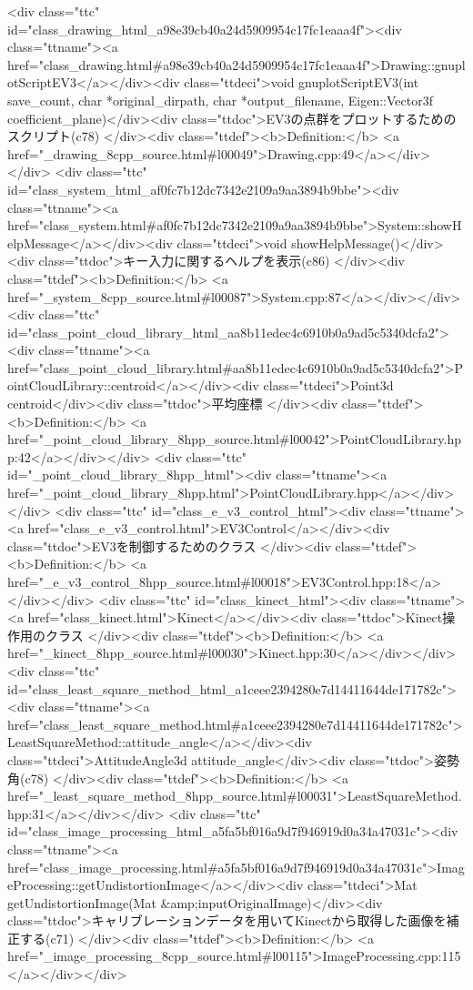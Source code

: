 <div class="ttc" id="class_drawing_html_a98e39cb40a24d5909954c17fc1eaaa4f"><div class="ttname"><a href="class_drawing.html#a98e39cb40a24d5909954c17fc1eaaa4f">Drawing::gnuplotScriptEV3</a></div><div class="ttdeci">void gnuplotScriptEV3(int save_count, char *original_dirpath, char *output_filename, Eigen::Vector3f coefficient_plane)</div><div class="ttdoc">EV3の点群をプロットするためのスクリプト(c78) </div><div class="ttdef"><b>Definition:</b> <a href="_drawing_8cpp_source.html#l00049">Drawing.cpp:49</a></div></div>
<div class="ttc" id="class_system_html_af0fc7b12dc7342e2109a9aa3894b9bbe"><div class="ttname"><a href="class_system.html#af0fc7b12dc7342e2109a9aa3894b9bbe">System::showHelpMessage</a></div><div class="ttdeci">void showHelpMessage()</div><div class="ttdoc">キー入力に関するヘルプを表示(c86) </div><div class="ttdef"><b>Definition:</b> <a href="_system_8cpp_source.html#l00087">System.cpp:87</a></div></div>
<div class="ttc" id="class_point_cloud_library_html_aa8b11edec4c6910b0a9ad5c5340dcfa2"><div class="ttname"><a href="class_point_cloud_library.html#aa8b11edec4c6910b0a9ad5c5340dcfa2">PointCloudLibrary::centroid</a></div><div class="ttdeci">Point3d centroid</div><div class="ttdoc">平均座標 </div><div class="ttdef"><b>Definition:</b> <a href="_point_cloud_library_8hpp_source.html#l00042">PointCloudLibrary.hpp:42</a></div></div>
<div class="ttc" id="_point_cloud_library_8hpp_html"><div class="ttname"><a href="_point_cloud_library_8hpp.html">PointCloudLibrary.hpp</a></div></div>
<div class="ttc" id="class_e_v3_control_html"><div class="ttname"><a href="class_e_v3_control.html">EV3Control</a></div><div class="ttdoc">EV3を制御するためのクラス </div><div class="ttdef"><b>Definition:</b> <a href="_e_v3_control_8hpp_source.html#l00018">EV3Control.hpp:18</a></div></div>
<div class="ttc" id="class_kinect_html"><div class="ttname"><a href="class_kinect.html">Kinect</a></div><div class="ttdoc">Kinect操作用のクラス </div><div class="ttdef"><b>Definition:</b> <a href="_kinect_8hpp_source.html#l00030">Kinect.hpp:30</a></div></div>
<div class="ttc" id="class_least_square_method_html_a1ceee2394280e7d14411644de171782c"><div class="ttname"><a href="class_least_square_method.html#a1ceee2394280e7d14411644de171782c">LeastSquareMethod::attitude_angle</a></div><div class="ttdeci">AttitudeAngle3d attitude_angle</div><div class="ttdoc">姿勢角(c78) </div><div class="ttdef"><b>Definition:</b> <a href="_least_square_method_8hpp_source.html#l00031">LeastSquareMethod.hpp:31</a></div></div>
<div class="ttc" id="class_image_processing_html_a5fa5bf016a9d7f946919d0a34a47031c"><div class="ttname"><a href="class_image_processing.html#a5fa5bf016a9d7f946919d0a34a47031c">ImageProcessing::getUndistortionImage</a></div><div class="ttdeci">Mat getUndistortionImage(Mat &amp;inputOriginalImage)</div><div class="ttdoc">キャリブレーションデータを用いてKinectから取得した画像を補正する(c71) </div><div class="ttdef"><b>Definition:</b> <a href="_image_processing_8cpp_source.html#l00115">ImageProcessing.cpp:115</a></div></div>
